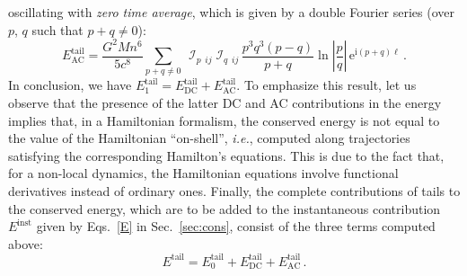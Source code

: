 \documentclass[prd,preprint,superscriptaddress,tightenlines,nofootinbib,
  eqsecnum,showpacs]{revtex4}
\newcommand{\ui}{\mathrm{i}}
\newcommand{\ue}{\mathrm{e}}
\begin{document}
oscillating with \textit{zero time average}, which is given by a double Fourier
series (over $p$, $q$ such that $p+q \not= 0$):
%
\begin{equation}\label{EAC}
E_\text{AC}^\text{tail} = \frac{G^2M n^6}{5c^8}
\sum_{p+q \not=
    0}\,\mathop{{\mathcal{I}}}_{p}{}_{\!\!ij}\mathop{{\mathcal{I}}}_{q}{}_{\!\!ij}
  \,\frac{p^3q^3(p-q)}{p+q}
  \ln\left|\frac{p}{q}\right|\,\ue^{\ui(p+q)\ell}\,.
\end{equation}
%
In conclusion, we have
$E_1^\text{tail} = E_\text{DC}^\text{tail} + E_\text{AC}^\text{tail}$. To
emphasize this result, let us observe that the presence of the latter DC and
AC contributions in the energy implies that, in a Hamiltonian formalism,
the conserved energy is not equal to the value of the Hamiltonian
``on-shell'', \textit{i.e.}, computed along trajectories satisfying the
corresponding Hamilton's equations. This is due to the fact that, for a
non-local dynamics, the Hamiltonian equations involve functional derivatives
instead of ordinary ones. Finally, the complete contributions of tails to the
conserved energy, which are to be added to the instantaneous contribution
$E^\text{inst}$ given by Eqs.~\eqref{E} in Sec.~\ref{sec:cons}, consist of the
three terms computed above:
%
\begin{equation}\label{Etailthree}
E^\text{tail} = E_0^\text{tail} + E_\text{DC}^\text{tail} + E_\text{AC}^\text{tail}\,.
\end{equation}
\end{document}
